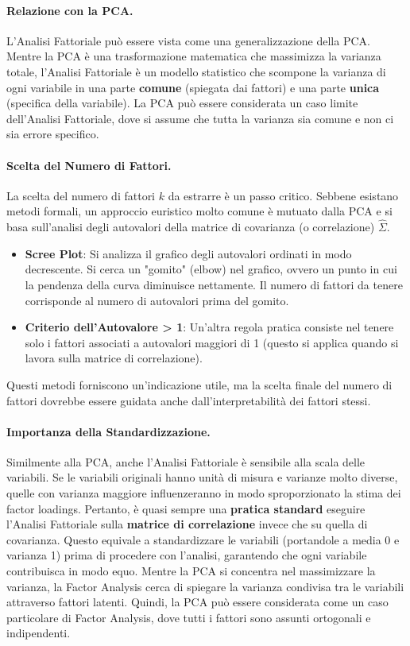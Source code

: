 \paragraph{Relazione con la PCA.}
L'Analisi Fattoriale può essere vista come una generalizzazione della PCA.
Mentre la PCA è una trasformazione matematica che massimizza la varianza
totale, l'Analisi Fattoriale è un modello statistico che scompone la varianza
di ogni variabile in una parte \textbf{comune} (spiegata dai fattori) e una
parte \textbf{unica} (specifica della variabile). La PCA può essere considerata
un caso limite dell'Analisi Fattoriale, dove si assume che tutta la varianza sia
comune e non ci sia errore specifico.

\paragraph{Scelta del Numero di Fattori.}
La scelta del numero di fattori \(k\) da estrarre è un passo critico. Sebbene
esistano metodi formali, un approccio euristico molto comune è mutuato dalla
PCA e si basa sull'analisi degli autovalori della matrice di covarianza (o
correlazione) \(\hat{\Sigma}\).
\begin{itemize}
    \item \textbf{Scree Plot}: Si analizza il grafico degli autovalori ordinati
    in modo decrescente. Si cerca un "gomito" (elbow) nel grafico, ovvero un
    punto in cui la pendenza della curva diminuisce nettamente. Il numero di
    fattori da tenere corrisponde al numero di autovalori prima del gomito.
    \item \textbf{Criterio dell'Autovalore > 1}: Un'altra regola pratica
    consiste nel tenere solo i fattori associati a autovalori maggiori di 1
    (questo si applica quando si lavora sulla matrice di correlazione).
\end{itemize}
Questi metodi forniscono un'indicazione utile, ma la scelta finale del numero di
fattori dovrebbe essere guidata anche dall'interpretabilità dei fattori stessi.

\paragraph{Importanza della Standardizzazione.}
Similmente alla PCA, anche l'Analisi Fattoriale è sensibile alla scala delle
variabili. Se le variabili originali hanno unità di misura e varianze molto
diverse, quelle con varianza maggiore influenzeranno in modo sproporzionato la
stima dei factor loadings. Pertanto, è quasi sempre una \textbf{pratica
standard} eseguire l'Analisi Fattoriale sulla \textbf{matrice di correlazione}
invece che su quella di covarianza. Questo equivale a standardizzare le
variabili (portandole a media 0 e varianza 1) prima di procedere con l'analisi,
garantendo che ogni variabile contribuisca in modo equo.
Mentre la PCA si concentra nel massimizzare la varianza, la Factor Analysis
cerca di spiegare la varianza condivisa tra le variabili attraverso fattori
latenti. Quindi, la PCA può essere considerata come un caso particolare di
Factor Analysis, dove tutti i fattori sono assunti ortogonali e indipendenti.

